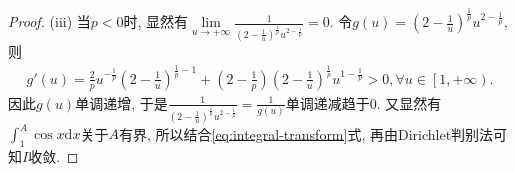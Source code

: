 \documentclass[../../main.tex]{subfiles}
\begin{document}
\begin{proof}
(iii) 当$p<0$时, 显然有$\underset{u\rightarrow +\infty}{\lim}\frac{1}{\left( 2-\frac{1}{u} \right) ^{\frac{1}{p}}u^{2-\frac{1}{p}}}=0$. 令$g\left( u \right) =\left( 2-\frac{1}{u} \right) ^{\frac{1}{p}}u^{2-\frac{1}{p}}$, 则
\begin{align*}
g'\left( u \right) =\frac{2}{p}u^{-\frac{1}{p}}\left( 2-\frac{1}{u} \right) ^{\frac{1}{p}-1}+\left( 2-\frac{1}{p} \right) \left( 2-\frac{1}{u} \right) ^{\frac{1}{p}}u^{1-\frac{1}{p}}>0,\forall u\in \left[ 1,+\infty \right).
\end{align*}
因此$g\left( u \right)$单调递增, 于是$\frac{1}{\left( 2-\frac{1}{u} \right) ^{\frac{1}{p}}u^{2-\frac{1}{p}}}=\frac{1}{g\left( u \right)}$单调递减趋于$0$. 又显然有$\int_1^A{\cos x\mathrm{d}x}$关于$A$有界, 所以结合\eqref{eq:integral-transform}式, 再由Dirichlet判别法可知$I$收敛.
\end{proof}
\end{document}
